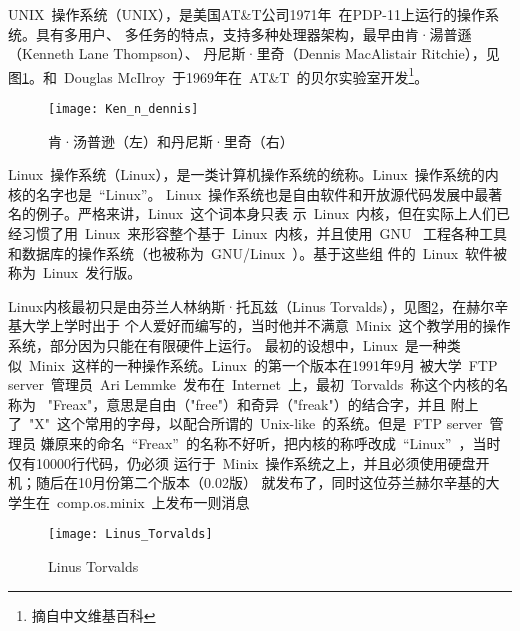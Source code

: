 UNIX~操作系统（UNIX），是美国AT\&T公司1971年~在PDP-11上运行的操作系统。具有多用户、
多任务的特点，支持多种处理器架构，最早由肯·湯普遜（Kenneth Lane Thompson）、
丹尼斯·里奇（Dennis MacAlistair Ritchie），见图\ref{fig:ken}。和~Douglas
McIlroy~于1969年在~AT\&T~的贝尔实验室开发\footnote{摘自中文维基百科}。\par
\begin{figure}[htbp]
    \centering
	\texttt{[image: Ken\_n\_dennis]}
    \caption{肯·汤普逊（左）和丹尼斯·里奇（右）}
    \label{fig:ken}
\end{figure}
Linux~操作系统（Linux），是一类计算机操作系统的统称。Linux~操作系统的内核的名字也是~“Linux”。
Linux~操作系统也是自由软件和开放源代码发展中最著名的例子。严格来讲，Linux~这个词本身只表
示~Linux~内核，但在实际上人们已经习惯了用~Linux~来形容整个基于~Linux~内核，并且使用~GNU~
工程各种工具和数据库的操作系统（也被称为~GNU/Linux~）。基于这些组
件的~Linux~软件被称为~Linux~发行版。

Linux内核最初只是由芬兰人林纳斯·托瓦兹（Linus
Torvalds），见图\ref{fig:linus}，在赫尔辛基大学上学时出于
个人爱好而编写的，当时他并不满意~Minix~这个教学用的操作系统，部分因为只能在有限硬件上运行。
最初的设想中，Linux~是一种类似~Minix~这样的一种操作系统。Linux~的第一个版本在1991年9月
被大学~FTP server~管理员~Ari Lemmke~发布在~Internet~上，最初~Torvalds~称这个内核的名称为
~"Freax"，意思是自由（"free"）和奇异（"freak"）的结合字，并且
附上了~"X"~这个常用的字母，以配合所谓的~Unix-like~的系统。但是~FTP server~管理员
嫌原来的命名~“Freax”~的名称不好听，把内核的称呼改成~“Linux”~，当时仅有10000行代码，仍必须
运行于~Minix~操作系统之上，并且必须使用硬盘开机；随后在10月份第二个版本（0.02版）
就发布了，同时这位芬兰赫尔辛基的大学生在~comp.os.minix~上发布一则消息\par
\begin{center}
\end{center}
\begin{figure}[htbp]
    \centering
    \texttt{[image: Linus\_Torvalds]}
    \caption{Linus Torvalds}
    \label{fig:linus}
\end{figure}

